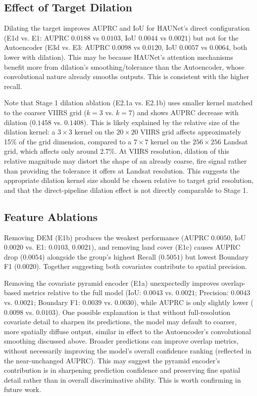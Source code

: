 \documentclass[a4paper, 11pt]{article} %
\begin{document}
\subsection{Effect of Target Dilation}
Dilating the target improves AUPRC and IoU for HAUNet's direct configuration (E1d vs. E1: AUPRC $0.0188$ vs $0.0103$, IoU $0.0044$ vs $0.0021$) but not for the Autoencoder (E3d vs. E3: AUPRC $0.0098$ vs $0.0120$, IoU $0.0057$ vs $0.0064$, both lower with dilation). This may be because HAUNet's attention mechanisms benefit more from dilation's smoothing/tolerance than the Autoencoder, whose convolutional nature already smooths outputs. This is consistent with the higher recall.

Note that Stage 1 dilation ablation (E2.1a vs. E2.1b) uses smaller kernel matched to the coarser VIIRS grid ($k=3$ vs. $k=7$) and shows AUPRC decrease with dilation ($0.1458$ vs. $0.1408$). This is likely explained by the relative size of the dilation kernel: a $3\times3$ kernel on the $20\times20$ VIIRS grid affects approximately 15\% of the grid dimension, compared to a $7\times7$ kernel on the $256\times256$ Landsat grid, which affects only around 2.7\%. At VIIRS resolution, dilation of this relative magnitude may distort the shape of an already coarse, fire signal rather than providing the tolerance it offers at Landsat resolution. This suggests the appropriate dilation kernel size should be chosen relative to target grid resolution, and that the direct-pipeline dilation effect is not directly comparable to Stage 1.

\subsection{Feature Ablations}
Removing DEM (E1b) produces the weakest performance (AUPRC $0.0050$, IoU $0.0020$ vs. E1: $0.0103$, $0.0021$), and removing land cover (E1c) causes AUPRC drop ($0.0054$) alongside the group's highest Recall ($0.5051$) but lowest Boundary F1 ($0.0020$). Together suggesting both covariates contribute to spatial precision.

Removing the covariate pyramid encoder (E1a) unexpectedly improves overlap-based metrics relative to the full model (IoU: $0.0043$ vs. $0.0021$; Precision: $0.0043$ vs. $0.0021$; Boundary F1: $0.0039$ vs. $0.0030$), while AUPRC is only slightly lower ($0.0098$ vs. $0.0103$). One possible explanation is that without full-resolution covariate detail to sharpen its predictions, the model may default to coarser, more spatially diffuse output, similar in effect to the Autoencoder's convolutional smoothing discussed above. Broader predictions can improve overlap metrics, without necessarily improving the model's overall confidence ranking (reflected in the near-unchanged AUPRC). This may suggest the pyramid encoder's contribution is in sharpening prediction confidence and preserving fine spatial detail rather than in overall discriminative ability. This is worth confirming in future work.
\end{document}
